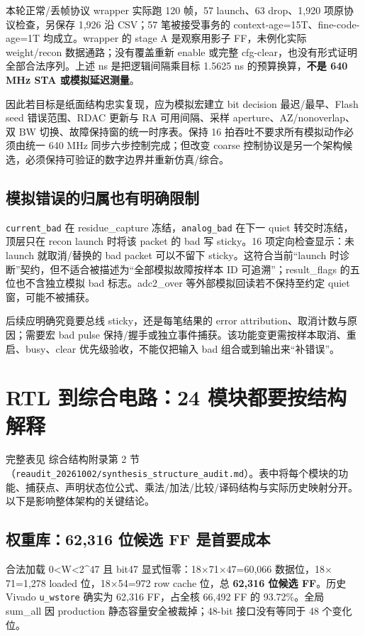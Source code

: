 \documentclass[UTF8,fontset=fandol,10pt,a4paper,openany]{ctexrep}
\newcommand{\code}[1]{\nolinkurl{#1}}
\begin{document}
本轮正常/丢帧协议 wrapper 实际跑 120 帧，57 launch、63 drop、1,920 项原协议检查，另保存 1,926 沿 CSV；57 笔被接受事务的 context-age=15T、fine-code-age=1T 均成立。wrapper 的 stage A 是观察用影子 FF，未例化实际 weight/recon 数据通路；没有覆盖重新 enable 或完整 cfg-clear，也没有形式证明全部合法序列。上述 ns 是把逻辑间隔乘目标 1.5625 ns 的预算换算，\textbf{不是 640 MHz STA 或模拟延迟测量}。


因此若目标是纸面结构忠实复现，应为模拟宏建立 bit decision 最迟/最早、Flash seed 错误范围、RDAC 更新与 RA 可用间隔、采样 aperture、AZ/nonoverlap、双 BW 切换、故障保持窗的统一时序表。保持 16 拍吞吐不要求所有模拟动作必须由统一 640 MHz 同步六步控制完成；但改变 coarse 控制协议是另一个架构候选，必须保持可验证的数字边界并重新仿真/综合。


\subsection{模拟错误的归属也有明确限制}


\code{current_bad} 在 residue\_capture 冻结，\code{analog_bad} 在下一 quiet 转交时冻结，顶层只在 recon launch 时将该 packet 的 bad 写 sticky。16 项定向检查显示：未 launch 就取消/替换的 bad packet 可以不留下 sticky。这符合当前“launch 时诊断”契约，但不适合被描述为“全部模拟故障按样本 ID 可追溯”；result\_flags 的五位也不含独立模拟 bad 标志。adc2\_over 等外部模拟回读若不保持至约定 quiet 窗，可能不被捕获。


后续应明确究竟要总线 sticky，还是每笔结果的 error attribution、取消计数与原因；需要宏 bad pulse 保持/握手或独立事件捕获。该功能变更需按样本取消、重启、busy、clear 优先级验收，不能仅把输入 bad 组合或到输出来“补错误”。


\section{RTL 到综合电路：24 模块都要按结构解释}


完整表见 综合结构附录第 2 节（\code{reaudit_20261002/synthesis_structure_audit.md}）。表中将每个模块的功能、捕获点、声明状态位公式、乘法/加法/比较/译码结构与实际历史映射分开。以下是影响整体架构的关键结论。


\subsection{权重库：62,316 位候选 FF 是首要成本}


合法加载 0<W<2\textasciicircum{}47 且 bit47 显式恒零：18\ensuremath{\times}71\ensuremath{\times}47=60,066 数据位，18\ensuremath{\times}71=1,278 loaded 位，18\ensuremath{\times}54=972 row cache 位，总 \textbf{62,316 位候选 FF}。历史 Vivado \code{u_wstore} 确实为 62,316 FF，占全核 66,492 FF 的 93.72\%。全局 sum\_all 因 production 静态容量安全被裁掉；48-bit 接口没有等同于 48 个变化位。
\end{document}
